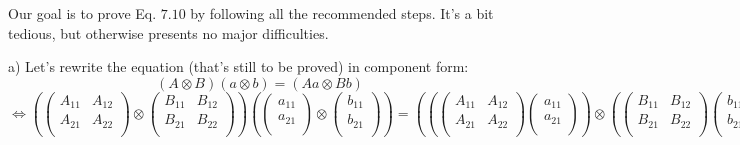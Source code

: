 \documentclass[solutions.tex]{subfiles}
\begin{document}
Our goal is to prove Eq. $7.10$ by following all the recommended steps. It's
a bit tedious, but otherwise presents no major difficulties. \\

\hrr

a) Let's rewrite the equation (that's still to be proved)
in component form:
\[
	(A\otimes B)(a\otimes b) = (Aa\otimes Bb)
\]
\[
	\Leftrightarrow
	\left(\begin{pmatrix}
		A_{11} & A_{12} \\
		A_{21} & A_{22} \\
	\end{pmatrix}\otimes\begin{pmatrix}
		B_{11} & B_{12} \\
		B_{21} & B_{22} \\
	\end{pmatrix}\right)\left(
	\begin{pmatrix}
		a_{11} \\
		a_{21} \\
	\end{pmatrix}\otimes\begin{pmatrix}
		b_{11} \\
		b_{21} \\
	\end{pmatrix}\right) = \left(
		\left(\begin{pmatrix}
			A_{11} & A_{12} \\
			A_{21} & A_{22} \\
		\end{pmatrix}\begin{pmatrix}
			a_{11} \\
			a_{21} \\
		\end{pmatrix}\right)
		\otimes
		\left(\begin{pmatrix}
			B_{11} & B_{12} \\
			B_{21} & B_{22} \\
		\end{pmatrix}\begin{pmatrix}
			b_{11} \\
			b_{21} \\
		\end{pmatrix}\right)
	\right)
\]

\hrr
\end{document}

